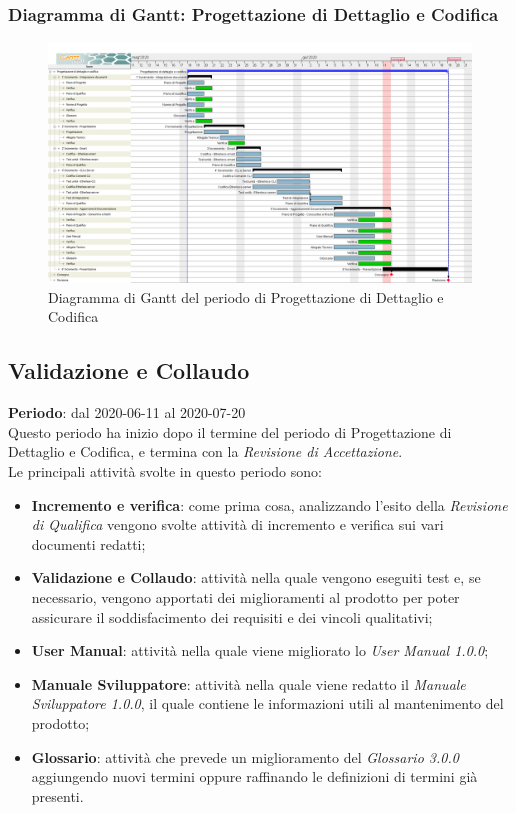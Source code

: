 \subsubsection{Diagramma di Gantt: Progettazione di Dettaglio e Codifica}
	\begin{figure}[h]
		\centering
		\includegraphics[width=1.1\textwidth]{./res/img/DiagrammiGantt/prog_dett_gantt.png}
		\caption{Diagramma di Gantt del periodo di Progettazione di Dettaglio e Codifica}
	\end{figure}
	

\newpage

\subsection{Validazione e Collaudo}
\textbf{Periodo}: dal 2020-06-11 al 2020-07-20 \\
Questo periodo ha inizio dopo il termine del periodo di Progettazione di Dettaglio e Codifica, e termina con la \textit{Revisione di Accettazione}. \\
Le principali attività svolte in questo periodo sono:
\begin{itemize}
	\item \textbf{Incremento e verifica}: come prima cosa, analizzando l'esito della \textit{Revisione di Qualifica} vengono svolte attività di incremento e verifica sui vari documenti redatti;
	\item \textbf{Validazione e Collaudo}: attività nella quale vengono eseguiti test e, se necessario, vengono apportati dei miglioramenti al prodotto per poter assicurare il soddisfacimento dei requisiti e dei vincoli qualitativi;
	\item \textbf{User Manual}: attività nella quale viene migliorato lo \textit{User Manual 1.0.0};
	\item \textbf{Manuale Sviluppatore}: attività nella quale viene redatto il \textit{Manuale Sviluppatore 1.0.0}, il quale contiene le informazioni utili al mantenimento del prodotto;
	\item \textbf{Glossario}: attività che prevede un miglioramento del \textit{Glossario 3.0.0} aggiungendo nuovi termini oppure raffinando le definizioni di termini già presenti.
\end{itemize}
